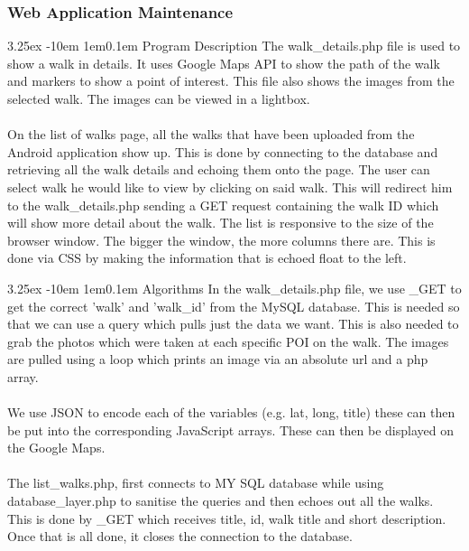 \documentclass[12pt]{article}
\makeatletter
\renewcommand{\paragraph}{
  \@startsection{paragraph}{4}
  {\z@}{3.25ex \@plus -10em \@minus 1em}{0.1em}
  {\normalfont\normalsize\bfseries}
}
\makeatother
\begin{document}
\subsubsection{Web Application Maintenance}
\paragraph{Program Description} 
The walk\_details.php file is used to show a walk in details. It uses Google Maps API to show the path of the walk and markers to show a point of interest. This file also shows the images from the selected walk. The images can be viewed in a lightbox.
~\\\\
On the list of walks page, all the walks that have been uploaded from the Android application show up. This is done by connecting to the database and retrieving all the walk details and echoing them onto the page. The user can select walk he would like to view by clicking on said walk. This will redirect him to the walk\_details.php sending a GET request containing the walk ID which will show more detail about the walk.  The list is responsive to the size of the browser window. The bigger the window, the more columns there are. This is done via CSS by making the information that is echoed float to the left.

\paragraph{Algorithms}
In the walk\_details.php file, we use \textdollar\_GET to get the correct 'walk' and 'walk\_id' from the MySQL database. This is needed so that we can use a query which pulls just the data we want. This is also needed to grab the photos which were taken at each specific POI on the walk. The images are pulled using a loop which prints an image via an absolute url and a php array.
~\\\\
We use JSON to encode each of the variables (e.g. \textdollar lat, \textdollar long, \textdollar title) these can then be put into the corresponding JavaScript arrays. These can then be displayed on the Google Maps. 
~\\\\
The list\_walks.php, first connects to MY SQL database while using \newline database\_layer.php to sanitise the queries and then echoes out all the walks. This is done by \textdollar\_GET which receives title, id, walk title and short description. Once that is all done, it closes the connection to the database.
\end{document}
